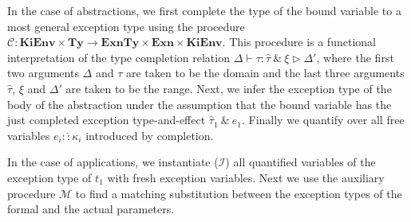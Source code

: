 \documentclass{llncs}
\newcommand{\ClassKiEnv}{\mathbf{KiEnv}}
\newcommand{\ClassTy}{\mathbf{Ty}}
\newcommand{\ClassExnTy}{\mathbf{ExnTy}}
\newcommand{\ClassExn}{\mathbf{Exn}}
\newcommand{\ExnTy}{\widehat\tau}
\newcommand{\Exn}{\xi}
\newcommand{\ExnVar}{e}
\newcommand{\Kind}{\kappa}                          %
\newcommand{\KindENV}{\Delta}
\newcommand{\JudgeComplete}[5]{{#1 \vdash #2 : #3\ \&\ #4 \triangleright #5}}
\newcommand{\Ty}{\tau}
\begin{document}
In the case of abstractions, we first complete the type of the bound variable to a most general exception type using the procedure \ensuremath{\mathcal{C}:\ClassKiEnv\times \ClassTy\to \ClassExnTy\times \ClassExn\times \ClassKiEnv}. This procedure is a functional interpretation of the type completion relation $\JudgeComplete{\KindENV}{\Ty}{\ExnTy}{\Exn}{\KindENV'}$, where the first two arguments $\KindENV$ and $\Ty$ are taken to be the domain and the last three arguments $\ExnTy$, $\Exn$ and $\KindENV'$ are taken to be the range. Next, we infer the exception type of the body of the abstraction under the assumption that the bound variable has the just completed exception type-and-effect $\ExnTy_1\ \&\ \ExnVar_1$. Finally we quantify over all free variables $\overline{\ExnVar_i :: \Kind_i}$ introduced by completion.

In the case of applications, we instantiate ($\mathcal{I}$) all quantified variables of the exception type of $t_1$ with fresh exception variables. Next we use the auxiliary procedure $\mathcal{M}$ to find a matching substitution between the exception types of the formal and the actual parameters.
\end{document}
